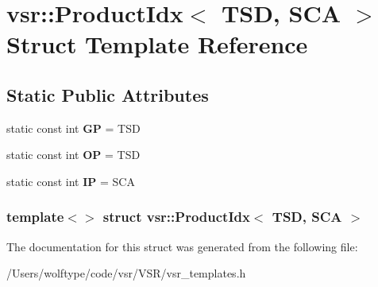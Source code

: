 \hypertarget{structvsr_1_1_product_idx_3_01_t_s_d_00_01_s_c_a_01_4}{\section{vsr\-:\-:Product\-Idx$<$ T\-S\-D, S\-C\-A $>$ Struct Template Reference}
\label{structvsr_1_1_product_idx_3_01_t_s_d_00_01_s_c_a_01_4}
}
\subsection*{Static Public Attributes}
\begin{DoxyCompactItemize}
\item 
\hypertarget{structvsr_1_1_product_idx_3_01_t_s_d_00_01_s_c_a_01_4_af02de1bec16da582bc2dce095353e7bd}{static const int {\bfseries G\-P} = T\-S\-D}\label{structvsr_1_1_product_idx_3_01_t_s_d_00_01_s_c_a_01_4_af02de1bec16da582bc2dce095353e7bd}

\item 
\hypertarget{structvsr_1_1_product_idx_3_01_t_s_d_00_01_s_c_a_01_4_a0f088bc8401ef4c65c875d1c3fc6ae2d}{static const int {\bfseries O\-P} = T\-S\-D}\label{structvsr_1_1_product_idx_3_01_t_s_d_00_01_s_c_a_01_4_a0f088bc8401ef4c65c875d1c3fc6ae2d}

\item 
\hypertarget{structvsr_1_1_product_idx_3_01_t_s_d_00_01_s_c_a_01_4_aa56542feca0093f16afcfe123999577e}{static const int {\bfseries I\-P} = S\-C\-A}\label{structvsr_1_1_product_idx_3_01_t_s_d_00_01_s_c_a_01_4_aa56542feca0093f16afcfe123999577e}

\end{DoxyCompactItemize}
\subsubsection*{template$<$$>$ struct vsr\-::\-Product\-Idx$<$ T\-S\-D, S\-C\-A $>$}



The documentation for this struct was generated from the following file\-:\begin{DoxyCompactItemize}
\item 
/\-Users/wolftype/code/vsr/\-V\-S\-R/vsr\-\_\-templates.\-h\end{DoxyCompactItemize}
